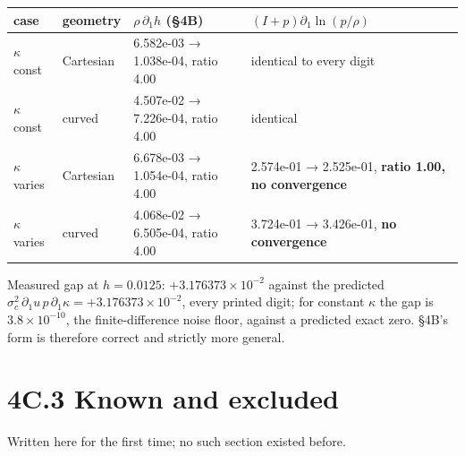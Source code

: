 \documentclass[11pt,a4paper]{article}
\begin{document}
\begin{longtable}{llll}
\toprule
case & geometry & $\rho\,\partial_1h$ (§4B) & $(I+p)\partial_1\ln(p/\rho)$ \\
\midrule
$\kappa$ const & Cartesian & 6.582e-03 → 1.038e-04, ratio 4.00 & identical to every digit \\
$\kappa$ const & curved & 4.507e-02 → 7.226e-04, ratio 4.00 & identical \\
$\kappa$ varies & Cartesian & 6.678e-03 → 1.054e-04, ratio 4.00 & 2.574e-01 → 2.525e-01, \textbf{ratio 1.00, no convergence} \\
$\kappa$ varies & curved & 4.068e-02 → 6.505e-04, ratio 4.00 & 3.724e-01 → 3.426e-01, \textbf{no convergence} \\
\bottomrule
\end{longtable}

Measured gap at $h=0.0125$: $+3.176373\times10^{-2}$ against the predicted
$\sigma_c^2\,\partial_1u\,p\,\partial_1\kappa=+3.176373\times10^{-2}$, every
printed digit; for constant $\kappa$ the gap is $3.8\times10^{-10}$, the
finite-difference noise floor, against a predicted exact zero. §4B's form is
therefore correct and strictly more general.

\section*{4C.3 Known and excluded}

Written here for the first time; no such section existed before.
\end{document}
